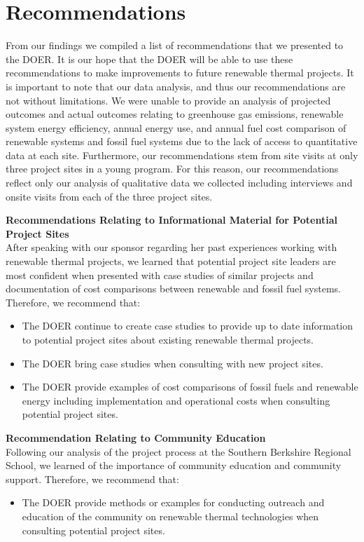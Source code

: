 \section*{Recommendations}
\par From our findings we compiled a list of recommendations that we presented to the DOER. It is our hope that the DOER will be able to use these recommendations to make improvements to future renewable thermal projects. It is important to note that our data analysis, and thus our recommendations are not without limitations. We were unable to provide an analysis of projected outcomes and actual outcomes relating to greenhouse gas emissions, renewable system energy efficiency, annual energy use, and annual fuel cost comparison of renewable systems and fossil fuel systems due to the lack of access to quantitative data at each site. Furthermore, our recommendations stem from site visits at only three project sites in a young program. For this reason, our recommendations reflect only our analysis of qualitative data we collected including interviews and onsite visits from each of the three project sites. 


\noindent
\textbf{Recommendations Relating to Informational Material for Potential Project Sites}\\
\indent After speaking with our sponsor regarding her past experiences working with renewable thermal projects, we learned that potential project site leaders are most confident when presented with case studies of similar projects and documentation of cost comparisons between renewable and fossil fuel systems. Therefore, we recommend that:
\begin{itemize}
  \item{The DOER continue to create case studies to provide up to date information to potential project sites about existing renewable thermal projects.}
  \item{The DOER bring case studies when consulting with new project sites.}
  \item{The DOER provide examples of cost comparisons of fossil fuels and renewable energy including implementation and operational costs when consulting potential project sites.}
\end{itemize}

\noindent
\textbf{Recommendation Relating to Community Education}\\
\indent Following our analysis of the project process at the Southern Berkshire Regional School, we learned of the importance of community education and community support. Therefore, we recommend that:
\begin{itemize}
  \item{The DOER provide methods or examples for conducting outreach and education of the community on renewable thermal technologies when consulting potential project sites.}
\end{itemize}

